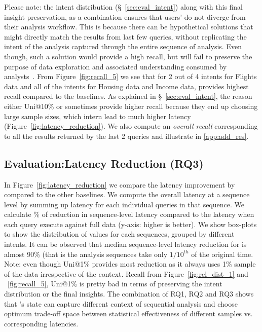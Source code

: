 Please note: the intent distribution (\S~\ref{sec:eval_intent}) along with this final insight preservation, as a combination ensures that users' do not diverge from their analysis workflow.  
This is because there can be hypothetical solutions that might directly match the results from last few queries, without replicating the intent of the analysis captured through the entire sequence of analysis. Even though, such a solution  would provide a high recall, but will fail to preserve the purpose of data exploration and associated understanding consumed by analysts~\cite{atena2020sigmod}. 
%
From Figure~\ref{fig:recall_5} we see that for 2 out of 4 intents for Flights data and all of the intents for Housing data and Income data, \name provides highest recall compared to the baselines. 
As explained in \S~\ref{sec:eval_intent}, the reason either {Uni@10\%} or \greedy sometimes provide higher recall because they end up choosing large sample sizes, which intern lead to much higher latency (Figure~\ref{fig:latency_reduction}). 
We also compute an \textit{overall recall} corresponding to all the results returned by the last 2 queries and illustrate in \ref{app:add_res}. 



\vspace{-0.2em}
\subsection{Evaluation:Latency Reduction (RQ3)}
\label{sec:eval_latency}
\vspace{-0.2em}

In Figure~\ref{fig:latency_reduction} we compare the latency improvement by \name compared to the other baselines. 
We compute the overall latency at a sequence level by summing up latency for each individual queries in that sequence. 
We calculate \% of reduction in sequence-level latency compared to the latency when each query execute against full data (y-axis: higher is better).
%
We show box-plots to show the distribution of values for each sequences, grouped by different intents. 
It can be observed that median sequence-level latency reduction for \name is almost 90\% (that is the analysis sequences take only $1/10^{th}$ of the original time.
%
Note: even though {Uni@1\%} provides most reduction as it always uses 1\% sample of the data irrespective of the context. 
Recall from Figure~\ref{fig:rel_dist_1} and ~\ref{fig:recall_5}, {Uni@1\%} is pretty bad in terms of preserving the intent distribution or the final insights. The combination of RQ1, RQ2 and RQ3 shows that \name's state can capture different context of sequential analysis and choose optimum trade-off space between statistical effectiveness of different samples vs. corresponding latencies.

